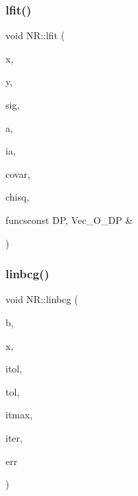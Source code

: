 \subsubsection{\texorpdfstring{lfit()}{lfit()}}
{\footnotesize\ttfamily void N\+R\+::lfit (\begin{DoxyParamCaption}\item[{\mbox{\hyperlink{namespaceNR_a9f943da53862537c552e2a770cb170ae}{Vec\+\_\+\+I\+\_\+\+DP}} \&}]{x,  }\item[{\mbox{\hyperlink{namespaceNR_a9f943da53862537c552e2a770cb170ae}{Vec\+\_\+\+I\+\_\+\+DP}} \&}]{y,  }\item[{\mbox{\hyperlink{namespaceNR_a9f943da53862537c552e2a770cb170ae}{Vec\+\_\+\+I\+\_\+\+DP}} \&}]{sig,  }\item[{\mbox{\hyperlink{namespaceNR_ab293e06a6bf799d8a7ed932b6852bcb8}{Vec\+\_\+\+I\+O\+\_\+\+DP}} \&}]{a,  }\item[{\mbox{\hyperlink{namespaceNR_a70331f3de2cf735819b5719e4048d7f3}{Vec\+\_\+\+I\+\_\+\+B\+O\+OL}} \&}]{ia,  }\item[{\mbox{\hyperlink{namespaceNR_adc1f8da33094b6bbeb1f5f899515ce54}{Mat\+\_\+\+O\+\_\+\+DP}} \&}]{covar,  }\item[{\mbox{\hyperlink{namespaceNR_af6ff762dd605ff477b8e52387253a02a}{DP}} \&}]{chisq,  }\item[{void }]{funcsconst D\+P, Vec\+\_\+\+O\+\_\+\+D\+P \& }\end{DoxyParamCaption})}

\mbox{\label{namespaceNR_af8b3348347ed7bf63c0554d522b33ee1}} 
\subsubsection{\texorpdfstring{linbcg()}{linbcg()}}
{\footnotesize\ttfamily void N\+R\+::linbcg (\begin{DoxyParamCaption}\item[{\mbox{\hyperlink{namespaceNR_a9f943da53862537c552e2a770cb170ae}{Vec\+\_\+\+I\+\_\+\+DP}} \&}]{b,  }\item[{\mbox{\hyperlink{namespaceNR_ab293e06a6bf799d8a7ed932b6852bcb8}{Vec\+\_\+\+I\+O\+\_\+\+DP}} \&}]{x,  }\item[{const int}]{itol,  }\item[{const \mbox{\hyperlink{namespaceNR_af6ff762dd605ff477b8e52387253a02a}{DP}}}]{tol,  }\item[{const int}]{itmax,  }\item[{int \&}]{iter,  }\item[{\mbox{\hyperlink{namespaceNR_af6ff762dd605ff477b8e52387253a02a}{DP}} \&}]{err }\end{DoxyParamCaption})}

